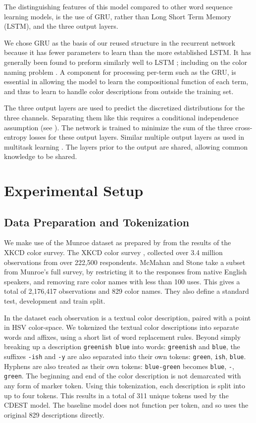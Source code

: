 \documentclass[11pt,a4paper]{article}
\newcommand{\parencite}{\citep}
\newcommand{\textcite}{\citet}
\begin{document}
The distinguishing features of this model compared to other word sequence learning models, is the use of GRU, rather than Long Short Term Memory (LSTM), and the three output layers.

We chose GRU as the basis of our reused structure in the recurrent network
because it has fewer parameters to learn than the more established LSTM.
It has generally been found to preform similarly well to LSTM \parencite{chung2014empirical};
including on the color naming problem \parencite{2016arXiv160603821M}.
A component for processing per-term such as the GRU, is essential in allowing the model to learn the compositional function of each term,  and thus to learn to handle color descriptions from outside the training set.

The three output layers are used to predict the discretized distributions for the three channels.
Separating them like this requires a conditional independence assumption (see ).
The network is trained to minimize the sum of the three cross-entropy losses for these output layers.
Similar multiple output layers as used in multitask learning \parencite{caruana1997multitask,collobert2008unified}.
The layers prior to the output are shared, allowing common knowledge to be shared.


\section{Experimental Setup}\label{sec:experimental-setup}
\subsection{Data Preparation and Tokenization}\label{sec:data-preparation}
We make use of the  Munroe dataset as prepared by \textcite{mcmahan2015bayesian} from the results of the XKCD color survey.
The XKCD color survey \parencite{Munroe2010XKCDdataset}, collected over 3.4 million observations from over 222,500 respondents.
McMahan and Stone take a subset from Munroe's full survey, by restricting it to the responses from native English speakers, 
and removing rare color names with less than 100 uses.
This gives a total of 2,176,417 observations and 829 color names. 
They also define a standard test, development and train split.


In the dataset each observation is a textual color description, paired with a point in HSV color-space.
We tokenized the textual color descriptions into separate words and affixes, using a short list of word replacement rules.
Beyond simply breaking up a description \texttt{greenish blue} into words: \texttt{greenish} and \texttt{blue}, the suffixes \texttt{-ish} and \texttt{-y} are also separated into their own tokens: \texttt{green}, \texttt{ish}, \texttt{blue}.
Hyphens are also treated as their own tokens: \texttt{blue-green} becomes \texttt{blue}, \texttt{-}, \texttt{green}.
The beginning and end of the color description is not demarcated with any form of marker token.
Using this tokenization, each description is split into up to four tokens.
This results in a total of 311 unique tokens used by the CDEST model.
The baseline model does not function per token, and so uses the original 829 descriptions directly.
\end{document}
